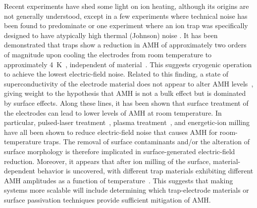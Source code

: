 \documentclass[%
12pt,
 amsmath,amssymb,
]{revtex4-2}
\begin{document}
Recent experiments have shed some light on ion heating, although its origins are not generally understood, except in a few experiments where technical noise has been found to predominate \cite{brownnutt_2015} or one experiment where an ion trap was specifically designed to have atypically high thermal (Johnson) noise \cite{innsbruck_first_time_2018}.  It has been demonstrated that  traps show a reduction in AMH of approximately two orders of magnitude upon cooling the electrodes from room temperature to approximately 4~K~\cite{PhysRevLett.100.013001_2008_1,PhysRevA.91.041402_2015}, independent of material~\cite{PhysRevA.89.012318_2014}.  This suggests cryogenic operation to achieve the lowest electric-field noise.  Related to this finding, a state of superconductivity of the electrode material does not appear to alter AMH levels~\cite{Chuang_SC_trap_2010,PhysRevA.89.012318_2014}, giving weight to the hypothesis that AMH is not a bulk effect but is dominated by surface effects.  Along these lines, it has been shown that surface treatment of the electrodes can lead to lower levels of AMH at room temperature.  In particular, pulsed-laser treatment~\cite{laser_cleaning_2011}, plasma treatment~\cite{PhysRevA.92.020302_2015}, and energetic-ion milling~\cite{PhysRevLett.109.103001_2012,PhysRevB.89.245435_2014,NIST_Ne_2014,sedlacek_milling_2018} have all been shown to reduce electric-field noise that causes AMH for room-temperature traps.  The removal of surface contaminants and/or the alteration of surface morphology is therefore implicated in surface-generated electric-field reduction.  Moreover, it appears that after ion milling of the surface, material-dependent behavior is uncovered, with different trap materials exhibiting different AMH amplitudes as a function of temperature~\cite{sedlacek_milling_2018}.  This suggests that making systems more scalable will include determining which trap-electrode materials or surface passivation techniques provide sufficient mitigation of AMH.
\end{document}
